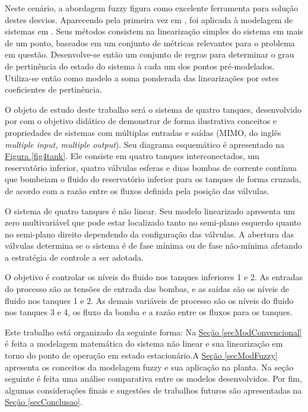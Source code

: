 Neste cenário, a abordagem fuzzy figura como excelente ferramenta para solução destes desvios. Aparecendo pela primeira vez em \cite{zadeh65}, foi aplicada à modelagem de sistemas em \cite{takagi_sugeno}. Seus métodos consistem na linearização simples do sistema em mais de um ponto, baseados em um conjunto de métricas relevantes para o problema em questão. Desenvolve-se então um conjunto de regras para determinar o grau de pertinência do estado do sistema à cada um dos pontos pré-modelados. Utiliza-se então como modelo a soma ponderada das linearizações por estes coeficientes de pertinência. 

O objeto de estudo deste trabalho será o sistema de quatro tanques, desenvolvido por \cite{johansson2} com o objetivo didático de demonstrar de forma ilustrativa conceitos e propriedades de sistemas com múltiplas entradas e saídas (MIMO, do inglês \textit{multiple input, multiple output}). Seu diagrama esquemático é apresentado na  \hyperref[fig4tank]{Figura \ref{fig4tank}}. Ele consiste em quatro tanques interconectados, um reservatório inferior, quatro válvulas esferas e duas bombas de corrente contínua que bombeiam o fluido do reservatório inferior para os tanques de forma cruzada, de acordo com a razão entre os fluxos definida pela posição das válvulas.

O sistema de quatro tanques é não linear. Seu modelo linearizado apresenta um zero multivariável que pode estar localizado tanto no semi-plano esquerdo quanto no semi-plano direito dependendo da configuração das válvulas. A abertura das válvulas determina se o sistema é de fase mínima ou de fase não-mínima afetando a estratégia de controle a ser adotada.

O objetivo é controlar os níveis do fluido nos tanques inferiores 1 e 2. As entradas do processo são as tensões de entrada das bombas, e as saídas são os níveis de fluido nos tanques 1 e 2. As demais variáveis de processo são os níveis do fluido nos tanques 3 e 4, os fluxo da bomba e a razão entre os fluxos para os tanques. 

Este trabalho está organizado da seguinte forma: Na \hyperref[secModConvencional]{Seção \ref{secModConvencional}} é feita a modelagem matemática do sistema não linear e sua linearização em torno do ponto de operação em estado estacionário.A  \hyperref[secModFuzzy]{Seção \ref{secModFuzzy}} apresenta os conceitos da modelagem fuzzy e sua aplicação na planta. Na seção seguinte é feita uma análise comparativa entre os modelos desenvolvidos. Por fim, algumas considerações finais e sugestões de trabalhos futuros são apresentadas na \hyperref[secConclusao]{Seção \ref{secConclusao}}.

%

